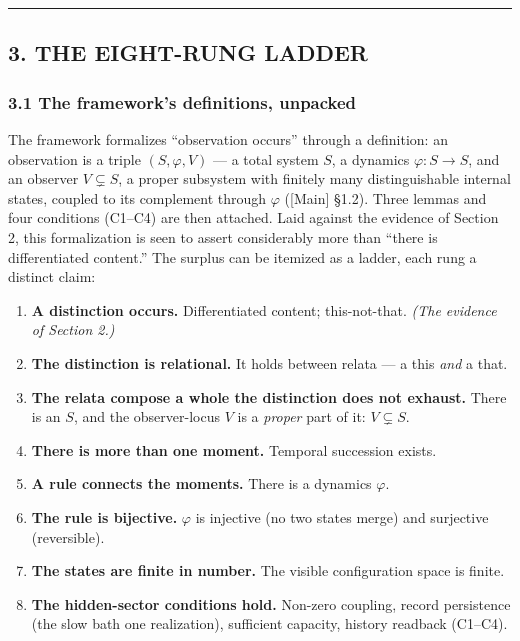 \documentclass[
]{article}
\providecommand{\tightlist}{%
  \setlength{\itemsep}{0pt}\setlength{\parskip}{0pt}}
\begin{document}
\begin{center}\rule{0.5\linewidth}{0.5pt}\end{center}

\hypertarget{the-eight-rung-ladder}{%
\subsection{3. THE EIGHT-RUNG LADDER}\label{the-eight-rung-ladder}}

\hypertarget{the-frameworks-definitions-unpacked}{%
\subsubsection{3.1 The framework's definitions,
unpacked}\label{the-frameworks-definitions-unpacked}}

The framework formalizes ``observation occurs'' through a definition: an
observation is a triple \((S, \varphi, V)\) --- a total system \(S\), a
dynamics \(\varphi: S \to S\), and an observer \(V \subsetneq S\), a
proper subsystem with finitely many distinguishable internal states,
coupled to its complement through \(\varphi\) ({[}Main{]} §1.2). Three
lemmas and four conditions (C1--C4) are then attached. Laid against the
evidence of Section 2, this formalization is seen to assert considerably
more than ``there is differentiated content.'' The surplus can be
itemized as a ladder, each rung a distinct claim:

\begin{enumerate}
\def\labelenumi{\arabic{enumi}.}
\tightlist
\item
  \textbf{A distinction occurs.} Differentiated content; this-not-that.
  \emph{(The evidence of Section 2.)}
\item
  \textbf{The distinction is relational.} It holds between relata --- a
  this \emph{and} a that.
\item
  \textbf{The relata compose a whole the distinction does not exhaust.}
  There is an \(S\), and the observer-locus \(V\) is a \emph{proper}
  part of it: \(V \subsetneq S\).
\item
  \textbf{There is more than one moment.} Temporal succession exists.
\item
  \textbf{A rule connects the moments.} There is a dynamics \(\varphi\).
\item
  \textbf{The rule is bijective.} \(\varphi\) is injective (no two
  states merge) and surjective (reversible).
\item
  \textbf{The states are finite in number.} The visible configuration
  space is finite.
\item
  \textbf{The hidden-sector conditions hold.} Non-zero coupling, record
  persistence (the slow bath one realization), sufficient capacity,
  history readback (C1--C4).
\end{enumerate}
\end{document}
